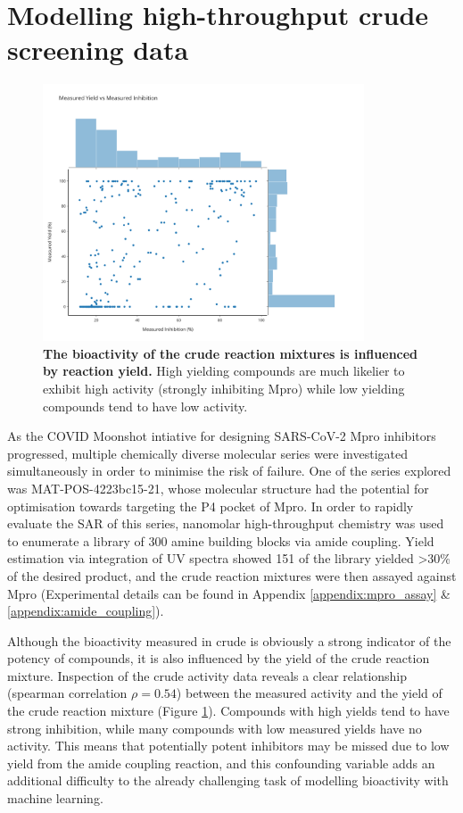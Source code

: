 \section{Modelling high-throughput crude screening data}

\begin{figure}[!t]
    \centering
    \includegraphics[width=0.85\textwidth]{Chapters/Crude/Figs/yield_vs_activity.pdf}
    \caption{\textbf{The bioactivity of the crude reaction mixtures is influenced by reaction yield.} High yielding compounds are much likelier to exhibit high activity (strongly inhibiting Mpro) while low yielding compounds tend to have low activity.}
    \label{fig:yield_activity}
\end{figure}

As the COVID Moonshot intiative for designing SARS-CoV-2 Mpro inhibitors progressed, multiple chemically diverse molecular series were investigated simultaneously in order to minimise the risk of failure. One of the series explored was MAT-POS-4223bc15-21, whose molecular structure had the potential for optimisation towards targeting the P4 pocket of Mpro. In order to rapidly evaluate the SAR of this series, nanomolar high-throughput chemistry was used to enumerate a library of 300 amine building blocks via amide coupling. Yield estimation via integration of UV spectra showed 151 of the library yielded >30\% of the desired product, and the crude reaction mixtures were then assayed against Mpro (Experimental details can be found in Appendix \ref{appendix:mpro_assay} \& \ref{appendix:amide_coupling}).

Although the bioactivity measured in crude is obviously a strong indicator of the potency of compounds, it is also influenced by the yield of the crude reaction mixture. Inspection of the crude activity data reveals a clear relationship (spearman correlation $\rho = 0.54$) between the measured activity and the yield of the crude reaction mixture (Figure \ref{fig:yield_activity}). Compounds with high yields tend to have strong inhibition, while many compounds with low measured yields have no activity. This means that potentially potent inhibitors may be missed due to low yield from the amide coupling reaction, and this confounding variable adds an additional difficulty to the already challenging task of modelling bioactivity with machine learning. 

